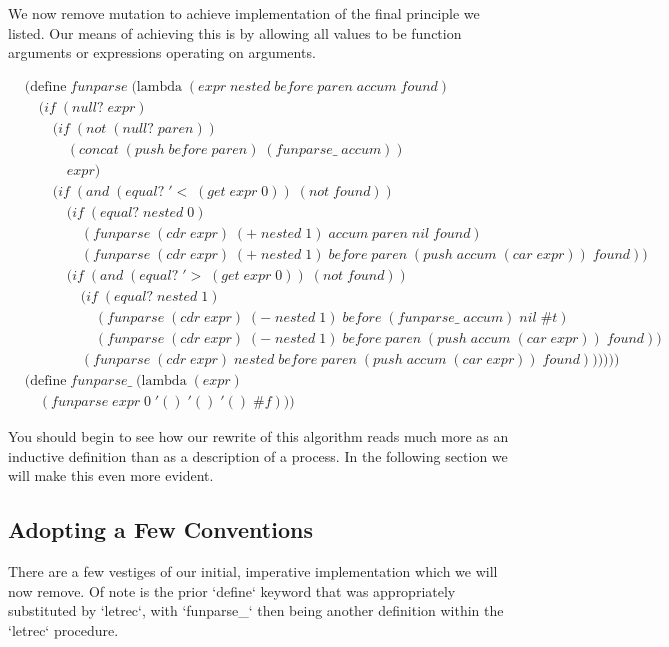 We now remove mutation to achieve implementation of the final principle we listed. Our 
means of achieving this is by allowing all values to be function arguments or expressions 
operating on arguments.

\begin{align*}
& (\text{define} \; funparse \; (\text{lambda} \; (expr \; nested \; before \; paren \; accum \; found) \; 
\\& \quad (if \; (null? \; expr)
\\& \qquad (if \; (not \; (null? \; paren))
\\& \qquad \quad (concat \; (push \; before \; paren) \; (funparse\_ \; accum))
\\& \qquad \quad expr)
\\& \qquad (if \; (and \; (equal? \; '< \; (get \; expr \; 0)) \; (not \; found))
\\& \qquad \quad (if \; (equal? \; nested \; 0)
\\& \qquad \qquad (funparse \; (cdr \; expr) \; (+ \; nested \; 1) \; accum \; paren \; nil \; found)
\\& \qquad \qquad (funparse \; (cdr \; expr) \; (+ \; nested \; 1) \; before \; paren \; (push \; accum \; (car \; expr)) \; found))
\\& \qquad \quad (if \; (and \; (equal? \; '> \; (get \; expr \; 0)) \; (not \; found))
\\& \qquad \qquad (if \; (equal? \; nested \; 1)
\\& \qquad \qquad \quad (funparse \; (cdr \; expr) \; (- \; nested \; 1) \; before \; (funparse\_ \; accum) \; nil \; \#t)
\\& \qquad \qquad \quad (funparse \; (cdr \; expr) \; (- \; nested \; 1) \; before \; paren \; (push \; accum \; (car \; expr)) \; found))
\\& \qquad \qquad (funparse \; (cdr \; expr) \; nested \; before \; paren \; (push \; accum \; (car \; expr)) \; found))))))
\\& (\text{define} \; funparse\_ \; (\text{lambda} \; (expr)
\\& \quad (funparse \; expr \; 0 \; '() \; '() \; '() \; \#f))) \; 
\end{align*}

You should begin to see how our rewrite of this algorithm reads much more as an inductive 
definition than as a description of a process. In the following section we will make this 
even more evident.

\subsection{Adopting a Few Conventions}
There are a few vestiges of our initial, imperative implementation which we will now remove. 
Of note is the prior `define` keyword that was appropriately substituted by `letrec`, with 
`funparse\_` then being another definition within the `letrec` procedure.


